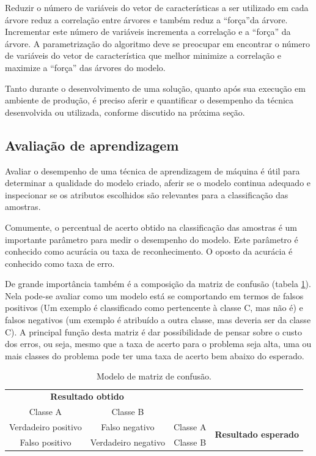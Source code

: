 Reduzir o número de variáveis do vetor de características a ser utilizado em cada árvore reduz a correlação entre árvores e também reduz a ``força''da árvore. Incrementar este número de variáveis incrementa a correlação e a ``força'' da árvore. A parametrização do algoritmo deve se preocupar em encontrar o número de variáveis do vetor de característica que melhor minimize a correlação e maximize a ``força'' das árvores do modelo.

Tanto durante o desenvolvimento de uma solução, quanto após sua execução em ambiente de produção, é preciso aferir e quantificar o desempenho da técnica desenvolvida ou utilizada, conforme discutido na próxima seção.

\subsection{Avaliação de aprendizagem}\label{sec:avaliacao}

Avaliar o desempenho de uma técnica de aprendizagem de máquina é útil para determinar a qualidade do modelo criado, aferir se o modelo continua adequado e inspecionar se os atributos escolhidos são relevantes para a classificação das amostras.

Comumente, o percentual de acerto obtido na classificação das amostras é um importante parâmetro para medir o desempenho do modelo. Este parâmetro é conhecido como acurácia ou taxa de reconhecimento. O oposto da acurácia é conhecido como taxa de erro.

De grande importância também é a composição da matriz de confusão (tabela \ref{tab:matrixConfusao}). Nela pode-se avaliar como um modelo está se comportando em termos de falsos positivos (Um exemplo é classificado como pertencente à classe C, mas não é) e falsos negativos (um exemplo é atribuído a outra classe, mas deveria ser da classe C). A principal função desta matriz é dar possibilidade de pensar sobre o custo dos erros, ou seja, mesmo que a taxa de acerto para o problema seja alta, uma ou mais classes do problema pode ter uma taxa de acerto bem abaixo do esperado.

\begin{table}[h]
  \centering
  \begin{tabular}{cccc}
  \multicolumn{2}{c}{\textbf{Resultado obtido}}                  &                               &                                              \\ \cline{1-2}
  \multicolumn{1}{|c|}{Classe A} & \multicolumn{1}{c|}{Classe B} &                               &                                              \\ \cline{1-3}
  \multicolumn{1}{|c|}{Verdadeiro positivo}       & \multicolumn{1}{c|}{Falso negativo}       & \multicolumn{1}{c|}{Classe A} & \multirow{2}{*}{\textbf{Resultado esperado}} \\ \cline{1-3}
  \multicolumn{1}{|c|}{Falso positivo}       & \multicolumn{1}{c|}{Verdadeiro negativo}       & \multicolumn{1}{c|}{Classe B} &                                              \\ \cline{1-3}
  \end{tabular}
  \caption{Modelo de matriz de confusão.}
  \label{tab:matrixConfusao}
\end{table}

